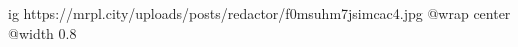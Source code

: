  
 
 
 
 

\ifcmt
  ig https://mrpl.city/uploads/posts/redactor/f0msuhm7jsimcac4.jpg
  @wrap center
  @width 0.8
\fi
